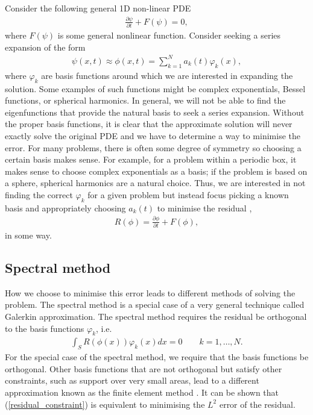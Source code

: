 Consider the following general 1D non-linear PDE
\begin{align}
\frac{\partial \psi}{\partial t} + F(\psi) = 0,
\end{align}
where $F(\psi)$ is some general nonlinear function. Consider seeking a series expansion of the form \cite{durran}
\begin{align}
\psi(x,t)\approx \phi(x,t) = \sum_{k=1}^{N}a_{k}(t)\varphi_{k}(x),
\end{align}
where $\varphi_{k}$ are basis functions around which we are interested in expanding the solution. Some examples of such functions might be complex exponentials, Bessel functions, or spherical harmonics. In general,  we will not be able to find the eigenfunctions that provide the natural basis to seek a series expansion. Without the proper basis functions, it is clear that the approximate solution will never exactly solve the original PDE and we have to determine a way to minimise the error. For many problems, there is often some degree of symmetry so choosing a certain basis makes sense. For example, for a problem within a periodic box, it makes sense to choose complex exponentials as a basis; if the problem is based on a sphere, spherical harmonics are a natural choice. Thus, we are interested in not finding the correct $\varphi_{k}$ for a given problem but instead focus picking a known basis and appropriately choosing $a_{k}(t)$ to minimise the residual \cite{durran},
\begin{align}
R(\phi) = \frac{\partial \phi}{\partial t} + F(\phi),
\end{align}
in some way.  

\subsection{Spectral method}
How we choose to minimise this error leads to different methods of solving the problem. The spectral method is a special case of a very general technique called Galerkin approximation.  The spectral method requires the residual be orthogonal to the basis functions $\varphi_{k}$, i.e.
\begin{align}
\int_{S}R(\phi(x))\varphi_{k}(x)dx = 0 \qquad k=1,\ldots,N.\label{residual_constraint}
\end{align}
For the special case of the spectral method, we require that the basis functions be orthogonal. Other basis functions that are not orthogonal but satisfy other constraints, such as support over very small areas, lead to a different approximation known as the finite element method \cite{durran}. It can be shown \cite{durran} that (\ref{residual_constraint}) is equivalent to minimising the $L^{2}$ error of the residual. 

